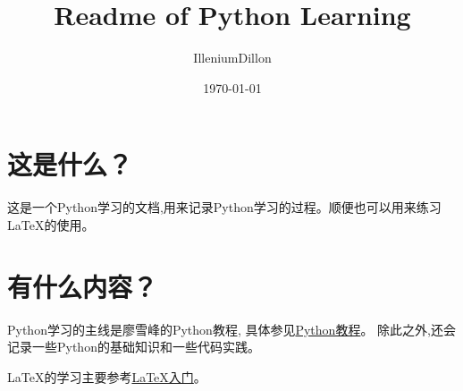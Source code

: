 \documentclass[a4paper,12pt]{article}
\begin{document}
    \title{Readme of Python Learning}
    \author{IlleniumDillon}
    \date{\today}
    \maketitle  

    \section{这是什么？}
        这是一个Python学习的文档,用来记录Python学习的过程。顺便也可以用来练习LaTeX的使用。
    \section{有什么内容？}
        Python学习的主线是廖雪峰的Python教程, 具体参见\href{https://www.liaoxuefeng.com/wiki/1016959663602400}{Python教程}。
        除此之外,还会记录一些Python的基础知识和一些代码实践。\par
        LaTeX的学习主要参考\href{https://oi-wiki.org/tools/latex/}{LaTeX入门}。
\end{document}
